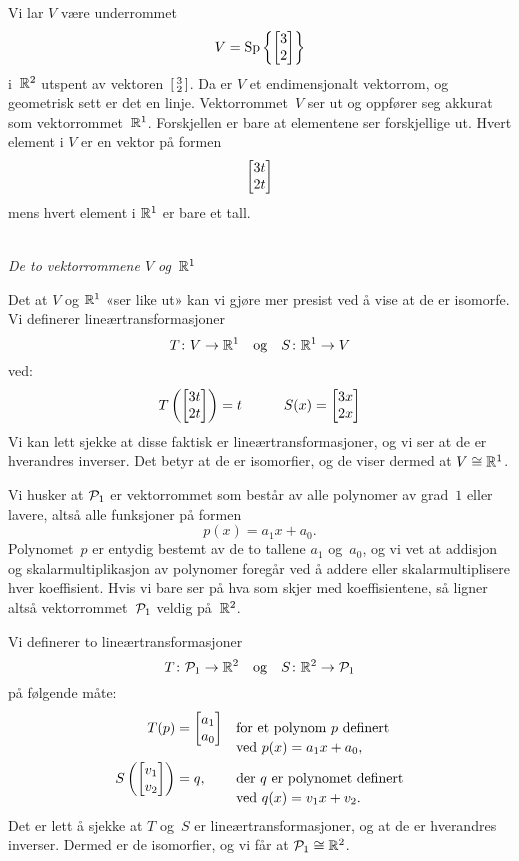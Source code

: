 \begin{ex}
Vi lar $V$ være underrommet
\[
V = \Sp \left\{ \vv{3}{2} \right\}
\]
i~$\R^2$ utspent av vektoren~$\vvS{3}{2}$.  Da er $V$ et
endimensjonalt vektorrom, og geometrisk sett er det en linje.
Vektorrommet~$V$ ser ut og oppfører seg akkurat som
vektorrommet~$\R^1$.  Forskjellen er bare at elementene ser
forskjellige ut.  Hvert element i $V$ er en vektor på formen
\[
\vv{3t}{2t}
\]
mens hvert element i $\R^1$ er bare et tall.
\begin{center}
\qquad
{}
\\[4pt]
{\small \textit{De to vektorrommene $V$ og~$\R^1$}}
\end{center}

Det at $V$ og $\R^1$ «ser like ut» kan vi gjøre mer presist ved å vise
at de er isomorfe.  Vi definerer lineærtransformasjoner
\[
T \colon V \to \R^1
\quad\text{og}\quad
S \colon \R^1 \to V
\]
ved:
\[
T \left( \vv{3t}{2t} \right) = t
\qquad\quad
S(x) = \vv{3x}{2x}
\]
Vi kan lett sjekke at disse faktisk er lineærtransformasjoner, og vi
ser at de er hverandres inverser.  Det betyr at de er isomorfier, og
de viser dermed at $V \iso \R^1$.
\end{ex}

\begin{ex}
Vi husker at $\P_1$ er vektorrommet som består av alle polynomer av
grad~$1$ eller lavere, altså alle funksjoner på formen
\[
p(x) = a_1 x + a_0.
\]
Polynomet~$p$ er entydig bestemt av de to tallene $a_1$ og~$a_0$, og
vi vet at addisjon og skalarmultiplikasjon av polynomer foregår ved å
addere eller skalarmultiplisere hver koeffisient.  Hvis vi bare ser på
hva som skjer med koeffisientene, så ligner altså vektorrommet~$\P_1$
veldig på~$\R^2$.

Vi definerer to lineærtransformasjoner
\[
T \colon \P_1 \to \R^2
\quad\text{og}\quad
S \colon \R^2 \to \P_1
\]
på følgende måte:
\begin{align*}
T(p) &= \vv{a_1}{a_0}
 &&\text{for et polynom~$p$ definert} \\[-8pt]
&&&\text{ved $p(x) = a_1x + a_0$,} \\
S\left( \vv{v_1}{v_2} \right) &= q,
 &&\text{der $q$ er polynomet definert} \\[-8pt]
&&&\text{ved $q(x) = v_1 x + v_2$.}
\end{align*}
Det er lett å sjekke at $T$ og~$S$ er lineærtransformasjoner, og at de
er hverandres inverser.  Dermed er de isomorfier, og vi får at
$\P_1 \iso \R^2$.
\end{ex}

